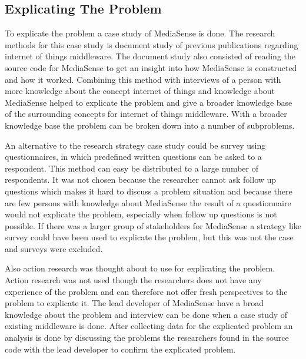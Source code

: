 \subsection{Explicating The Problem}
To explicate the problem a case study of MediaSense is done. The research methods for this case study is document study of previous publications regarding internet of things middleware. The document study also consisted of reading the source code for MediaSense to get an insight into how MediaSense is constructed and how it worked. Combining this method with interviews of a person with more knowledge about the concept internet of things and knowledge about MediaSense helped to explicate the problem and give a broader knowledge base of the surrounding concepts for internet of things middleware. With a broader knowledge base the problem can be broken down into a number of subproblems. 

An alternative to the research strategy case study could be survey using questionnaires, in which predefined written questions can be asked to a respondent. This method can easy be distributed to a large number of respondents. It was not chosen because the researcher cannot ask follow up questions which makes it hard to discuss a problem situation and because there are few persons with knowledge about MediaSense the result of a questionnaire would not explicate the problem, especially when follow up questions is not possible. If there was a larger group of stakeholders for MediaSense a strategy like survey could have been used to explicate the problem, but this was not the case and surveys were excluded.

Also action research was thought about to use for explicating the problem. Action research was not used though the researchers does not have any experience of the problem and can therefore not offer fresh perspectives to the problem to explicate it. The lead developer of MediaSense have a broad knowledge about the problem and interview can be done when a case study of existing middleware is done. After collecting data for the explicated problem an analysis is done by discussing the problems the researchers found in the source code with the lead developer to confirm the explicated problem. 


